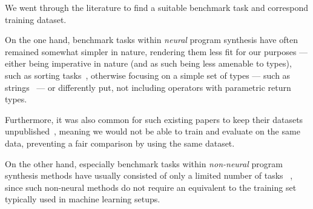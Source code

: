 \documentclass{article}
\begin{document}
We went through the literature to find a suitable benchmark task and correspond training dataset.

On the one hand, benchmark tasks within \emph{neural} program synthesis have often remained somewhat simpler in nature,
rendering them less fit for our purposes ---
either being imperative in nature (and as such being less amenable to types),
such as sorting tasks~\citep{npi,alphanpi},
otherwise focusing on a simple set of types --- such as strings~\citep{nsps} ---%
or differently put, not including operators with parametric return types.

Furthermore, it was also common for such existing papers to keep their datasets unpublished~\citep{nsps,deepcoder},
meaning we would not be able to train and evaluate on the same data,
preventing a fair comparison by using the same dataset.

On the other hand, especially benchmark tasks within \emph{non-neural} program synthesis methods have usually consisted of only a limited number of tasks%
~\citep{myth,lambda2,typedmil,houdini,tamandu,dilp,terpret},
since such non-neural methods do not require an equivalent to the training set typically used in machine learning setups.



\end{document}
